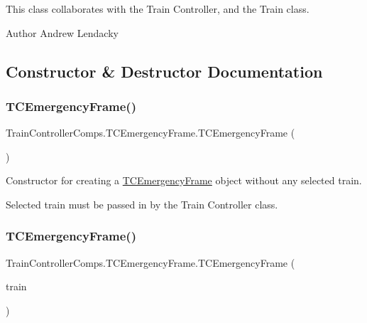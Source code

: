 This class collaborates with the Train Controller, and the Train class.

\begin{DoxyAuthor}{Author}
Andrew Lendacky 
\end{DoxyAuthor}


\subsection{Constructor \& Destructor Documentation}
\mbox{\label{classTrainControllerComps_1_1TCEmergencyFrame_a318efda39f1845bdcc8beacab2f15f02}} 
\subsubsection{\texorpdfstring{T\+C\+Emergency\+Frame()}{TCEmergencyFrame()}\hspace{0.1cm}{\footnotesize\ttfamily [1/2]}}
{\footnotesize\ttfamily Train\+Controller\+Comps.\+T\+C\+Emergency\+Frame.\+T\+C\+Emergency\+Frame (\begin{DoxyParamCaption}{ }\end{DoxyParamCaption})}



Constructor for creating a \hyperlink{classTrainControllerComps_1_1TCEmergencyFrame}{T\+C\+Emergency\+Frame} object without any selected train. 

Selected train must be passed in by the Train Controller class. \mbox{\label{classTrainControllerComps_1_1TCEmergencyFrame_a389f462d159a3b37df539384297e4aca}} 
\subsubsection{\texorpdfstring{T\+C\+Emergency\+Frame()}{TCEmergencyFrame()}\hspace{0.1cm}{\footnotesize\ttfamily [2/2]}}
{\footnotesize\ttfamily Train\+Controller\+Comps.\+T\+C\+Emergency\+Frame.\+T\+C\+Emergency\+Frame (\begin{DoxyParamCaption}\item[{\hyperlink{classTrainControllerComps_1_1TestTrain}{Test\+Train}}]{train }\end{DoxyParamCaption})}



